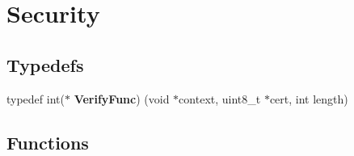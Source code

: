 \hypertarget{group__security}{}\section{Security}
\label{group__security}
\subsection*{Typedefs}
\begin{DoxyCompactItemize}
\item 
\mbox{\label{group__security_ga1b09f2f73eb988a994e010525463c4ba}} 
typedef int($\ast$ {\bfseries Verify\+Func}) (void $\ast$context, uint8\+\_\+t $\ast$cert, int length)
\end{DoxyCompactItemize}
\subsection*{Functions}

